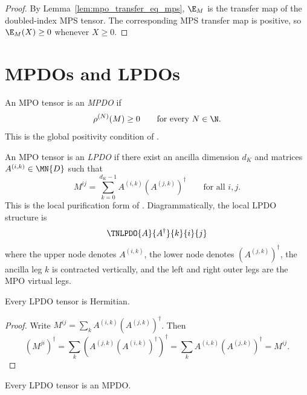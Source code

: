 \begin{proof}
    \leanok
    By Lemma~\ref{lem:mpo_transfer_eq_mps}, $\E_M$ is the transfer map of the
    doubled-index MPS tensor. The corresponding MPS transfer map is positive,
    so $\E_M(X) \ge 0$ whenever $X \ge 0$.
\end{proof}

\section{MPDOs and LPDOs}

\begin{definition}[MPDO]\label{def:mpdo}
    \leanok
    An MPO tensor is an \emph{MPDO} if
    \[
        \rho^{(N)}(M) \ge 0
        \qquad \text{for every } N \in \N.
    \]
    This is the global positivity condition of \cite[\S4.1]{Cirac2017MPDO_AnnPhys}.
\end{definition}

\begin{definition}[LPDO]\label{def:lpdo}
    \leanok
    An MPO tensor is an \emph{LPDO} if there exist an ancilla dimension $d_K$
    and matrices $A^{(i,k)} \in \MN{D}$ such that
    \[
        M^{ij} = \sum_{k=0}^{d_K-1} A^{(i,k)} (A^{(j,k)})^\dagger
        \qquad \text{for all } i,j.
    \]
    This is the local purification form of \cite[\S4.3]{Cirac2017MPDO_AnnPhys}.
    Diagrammatically, the local LPDO structure is
    \[
        \TNLPDO{A}{A^\dagger}{k}{i}{j}
    \]
    where the upper node denotes $A^{(i,k)}$, the lower node denotes
    $(A^{(j,k)})^\dagger$, the ancilla leg $k$ is contracted vertically,
    and the left and right outer legs are the MPO virtual legs.
\end{definition}

\begin{theorem}\label{thm:lpdo_hermitian}
    \leanok
    Every LPDO tensor is Hermitian.
\end{theorem}

\begin{proof}
    \leanok
    Write
    $M^{ij} = \sum_k A^{(i,k)} (A^{(j,k)})^\dagger$.
    Then
    \[
        (M^{ji})^\dagger
        = \sum_k \left(A^{(j,k)} (A^{(i,k)})^\dagger\right)^\dagger
        = \sum_k A^{(i,k)} (A^{(j,k)})^\dagger
        = M^{ij}.
    \]
\end{proof}

\begin{theorem}\label{thm:lpdo_is_mpdo}\notready
    Every LPDO tensor is an MPDO.
\end{theorem}
